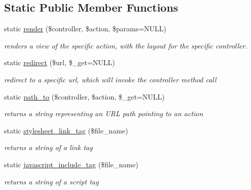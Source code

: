 \subsection*{Static Public Member Functions}
\begin{DoxyCompactItemize}
\item 
static \hyperlink{class_controller_a5b07b6865d0d974cd0e7198affae054f}{render} (\$controller, \$action, \$params=NULL)
\begin{DoxyCompactList}\small\item\em renders a view of the specific action, with the layout for the specific controller. \item\end{DoxyCompactList}\item 
static \hyperlink{class_controller_a6d111024445bc17d76a64b45f49d2d69}{redirect} (\$url, \$\_\-get=NULL)
\begin{DoxyCompactList}\small\item\em redirect to a specific url, which will invoke the controller method call \item\end{DoxyCompactList}\item 
static \hyperlink{class_controller_a18b050608bad4c25d29425778c76af49}{path\_\-to} (\$controller, \$action, \$\_\-get=NULL)
\begin{DoxyCompactList}\small\item\em returns a string representing an URL path pointing to an action \item\end{DoxyCompactList}\item 
static \hyperlink{class_controller_a86600c0af25bc98587b49950b3ae4408}{stylesheet\_\-link\_\-tag} (\$file\_\-name)
\begin{DoxyCompactList}\small\item\em returns a string of a link tag \item\end{DoxyCompactList}\item 
static \hyperlink{class_controller_a6732e0005a1160d36b0287eb95204755}{javascript\_\-include\_\-tag} (\$file\_\-name)
\begin{DoxyCompactList}\small\item\em returns a string of a script tag \item\end{DoxyCompactList}\end{DoxyCompactItemize}


